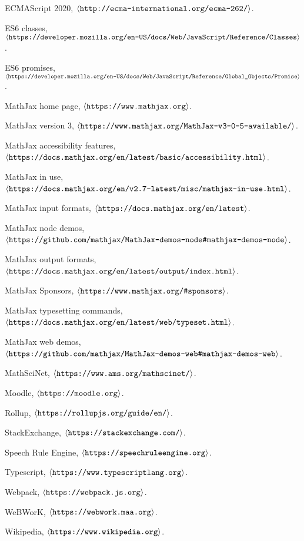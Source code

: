 \documentclass[11pt]{article} %
\def\URL#1{\hbox{\def~{\lower.2em\hbox{\char`\~}}\tt#1}}
\def\url#1{{\small$\left<\URL{#1}\right>$}}
\begin{document}
\begin{thebibliography}{99}

  ECMAScript 2020, \url{http://ecma-international.org/ecma-262/}.

  ES6 classes, \url{https://developer.mozilla.org/en-US/docs/Web/JavaScript/Reference/Classes}.
  
  ES6 promises, \url{https://developer.mozilla.org/en-US/docs/Web/JavaScript/Reference/Global\_Objects/Promise}.

  MathJax home page, \url{https://www.mathjax.org}.

  MathJax version 3, \url{https://www.mathjax.org/MathJax-v3-0-5-available/}.

  MathJax accessibility features, \url{https://docs.mathjax.org/en/latest/basic/accessibility.html}.

  MathJax in use, \url{https://docs.mathjax.org/en/v2.7-latest/misc/mathjax-in-use.html}.

  MathJax input formats, \url{https://docs.mathjax.org/en/latest}.
  
  MathJax node demos, \url{https://github.com/mathjax/MathJax-demos-node\#mathjax-demos-node}.

  MathJax output formats, \url{https://docs.mathjax.org/en/latest/output/index.html}.

  MathJax Sponsors, \url{https://www.mathjax.org/\#sponsors}.

  MathJax typesetting commands, \url{https://docs.mathjax.org/en/latest/web/typeset.html}.

  MathJax web demos, \url{https://github.com/mathjax/MathJax-demos-web\#mathjax-demos-web}.

  MathSciNet, \url{https://www.ams.org/mathscinet/}.

  Moodle, \url{https://moodle.org}.

  Rollup, \url{https://rollupjs.org/guide/en/}.

  StackExchange, \url{https://stackexchange.com/}.

  Speech Rule Engine, \url{https://speechruleengine.org}.

  Typescript, \url{https://www.typescriptlang.org}.

  Webpack, \url{https://webpack.js.org}.

  WeBWorK, \url{https://webwork.maa.org}.

  Wikipedia, \url{https://www.wikipedia.org}.

\end{thebibliography}
\end{document}
